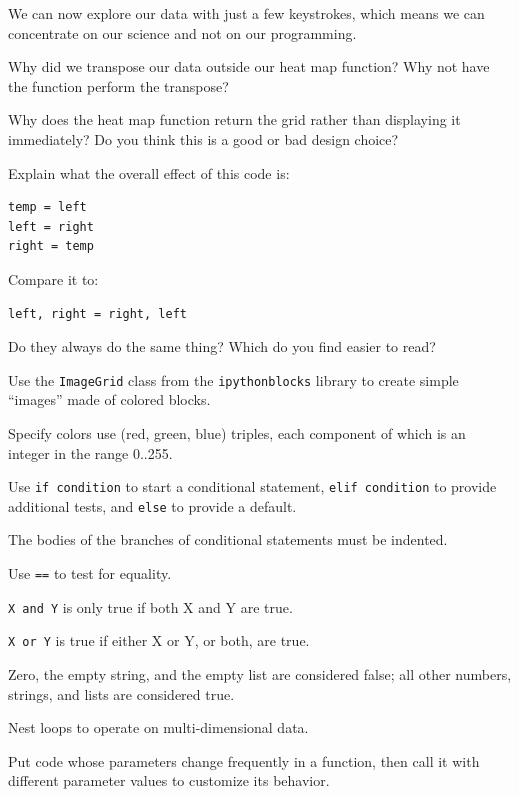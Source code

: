 \documentclass{book}
\begin{document}
We can now explore our data with just a few keystrokes, which means we
can concentrate on our science and not on our programming.

\begin{challenge}
  Why did we transpose our data outside our heat map function? Why not
  have the function perform the transpose?
\end{challenge}

\begin{challenge}
  Why does the heat map function return the grid rather than displaying
  it immediately? Do you think this is a good or bad design choice?
\end{challenge}

\begin{challenge}
  Explain what the overall effect of this code is:
\begin{verbatim}
temp = left
left = right
right = temp
\end{verbatim}
Compare it to:
\begin{verbatim}
left, right = right, left
\end{verbatim}
  Do they always do the same thing?
  Which do you find easier to read?
\end{challenge}

\begin{keypoints}
\begin{swcitemize}
\item
  Use the \texttt{ImageGrid} class from the \texttt{ipythonblocks}
  library to create simple ``images'' made of colored blocks.
\item
  Specify colors use (red, green, blue) triples, each component of which
  is an integer in the range 0..255.
\item
  Use \texttt{if condition} to start a conditional statement,
  \texttt{elif condition} to provide additional tests, and \texttt{else}
  to provide a default.
\item
  The bodies of the branches of conditional statements must be indented.
\item
  Use \texttt{==} to test for equality.
\item
  \texttt{X and Y} is only true if both X and Y are true.
\item
  \texttt{X or Y} is true if either X or Y, or both, are true.
\item
  Zero, the empty string, and the empty list are considered false; all
  other numbers, strings, and lists are considered true.
\item
  Nest loops to operate on multi-dimensional data.
\item
  Put code whose parameters change frequently in a function, then call
  it with different parameter values to customize its behavior.
\end{swcitemize}
\end{keypoints}
\end{document}
